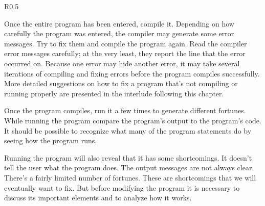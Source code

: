 \begin{wrapfigure}{R}{0.5\textwidth} \vspace{-0.5cm}
\vspace{-1.5cm}
\end{wrapfigure}

Once the entire program has been entered, compile it.  Depending on how carefully the program was entered, the compiler may generate some error messages.  Try to fix them and compile the program again.  Read the compiler error messages carefully; at the very least, they report the line that the error occurred on.  Because one error may hide another error, it may take several iterations of compiling and fixing errors before the program compiles successfully.  More detailed suggestions on how to fix a program that's not compiling or running properly are presented in the interlude following this chapter.

Once the program compiles, run it a few times to generate different fortunes.  While running the program compare the program's output to the program's code.  It should be possible to recognize what many of the program statements do by seeing how the program runs.  

Running the program will also reveal that it has some shortcomings.  It doesn't tell the user what the program does.  The output messages are not always clear.  There's a fairly limited number of fortunes.   These are shortcomings that we will eventually want to fix.  But before modifying the program it is necessary to discuss its important elements and to analyze how it works.

